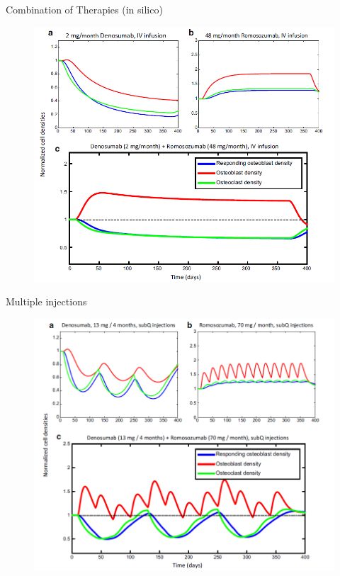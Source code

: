 \documentclass{beamer}
\begin{document}
\begin{frame}{Combination of Therapies (in silico)}
\begin{figure}[h]
	\centering
		\includegraphics[scale=0.45]{../Figures/fig_lemaire_fig16.png}
\end{figure}	

	
\end{frame}

\begin{frame}{Multiple injections}
\begin{figure}[h]
	\centering
		\includegraphics[scale=0.45]{../Figures/fig_lemaire_fig17.png}
\end{figure}	
\end{frame}
\end{document}
